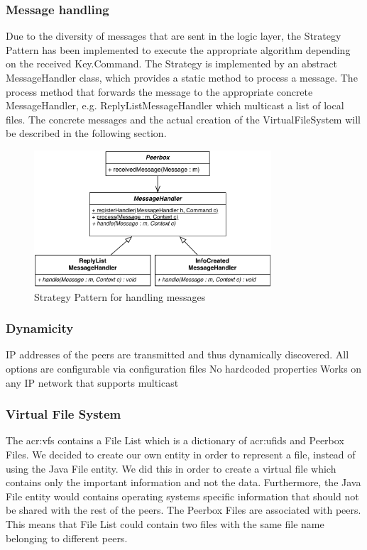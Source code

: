 \subsubsection{Message handling}
Due to the diversity of messages that are sent in the logic layer, the Strategy Pattern has been implemented to execute the appropriate algorithm depending on the received Key.Command. The Strategy is implemented by an abstract MessageHandler class, which provides a static method to process a message. The process method that forwards the message to the appropriate concrete MessageHandler, e.g. ReplyListMessageHandler which multicast a list of local files. The concrete messages and the actual creation of the VirtualFileSystem will be described in the following section. 

\begin{figure}[htbp]
\centering
\includegraphics[height=2in]{figures/mhStrategy.pdf}
\caption{Strategy Pattern for handling messages}
\label{fig:figures_mhStrategy}
\end{figure}

\subsubsection{Dynamicity}
IP addresses of the peers are transmitted and thus dynamically discovered.
All options are configurable via configuration files
No hardcoded properties
Works on any IP network that supports multicast


\subsubsection{Virtual File System}
    
The \gls{acr:vfs} contains a File List which is a dictionary of \glspl{acr:ufid} and Peerbox Files. We decided to create our own entity in order to represent a file, instead of using the Java File entity. We did this in order to create a virtual file which contains only the important information and not the data. Furthermore, the Java File entity would contains operating systems specific information that should not be shared with the rest of the peers. The Peerbox Files are associated with peers. This means that File List could contain two files with the same file name belonging to different peers.
    
